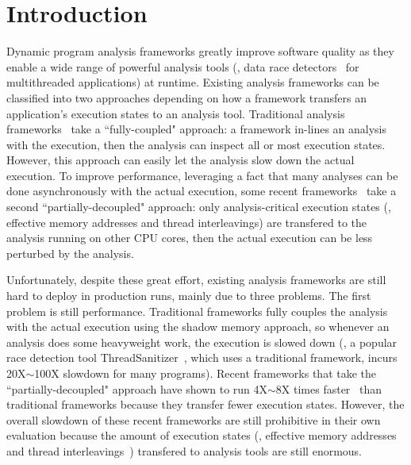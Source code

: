 \section{Introduction} \label{sec:intro}



Dynamic program analysis frameworks greatly improve software quality as they
enable a wide range of powerful analysis tools (\eg, data race
detectors~\cite{tsan, valgrind:pldi, wester:parallelizing:asplos13} for
multithreaded applications) at runtime. Existing analysis frameworks can be
classified into two approaches depending on how a framework transfers an
application's execution states to an analysis tool. Traditional analysis
frameworks~\cite{dynamorio, pin:pldi05, valgrind:pldi, lift:micro06, tsan} take
a ``fully-coupled" approach: a framework in-lines an analysis with the
execution, then the analysis can inspect all or most execution states. However,
this approach can easily let the analysis slow down the actual execution. To
improve performance, leveraging a fact that many analyses can be done
asynchronously with the actual execution, some recent
frameworks~\cite{decouple:usenix08, speck:asplos08, 
shadowreplica:ccs13, wester:parallelizing:asplos13, superpin, jungwoo:oopsla09}
take a second ``partially-decoupled" approach: only analysis-critical execution
states (\eg, effective memory addresses and thread interleavings) are
transfered to the analysis running on other CPU cores, then the actual execution
can be less perturbed by the analysis.




Unfortunately, despite these great effort, existing analysis frameworks are
still hard to deploy in production runs, mainly due to three problems. The first
problem is still performance. Traditional frameworks fully couples the analysis
with the actual execution using the shadow memory approach, so whenever an
analysis does some heavyweight work, the execution is slowed down (\eg, a
popular race detection tool ThreadSanitizer~\cite{tsan}, which uses a
traditional framework, incurs 20X$\sim$100X slowdown for many programs). Recent
frameworks that take the ``partially-decoupled" approach have shown to run
4X$\sim$8X times faster~\cite{shadowreplica:ccs13,
wester:parallelizing:asplos13} than traditional frameworks because they transfer
fewer 
execution states. However, the overall slowdown of these recent frameworks are
still prohibitive in their own evaluation because the amount of execution states
(\eg, effective memory addresses~\cite{shadowreplica:ccs13} and thread
interleavings~\cite{wester:parallelizing:asplos13}) transfered to analysis tools
are still enormous.


